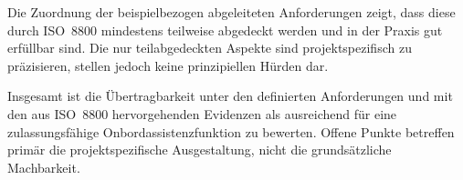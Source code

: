 Die Zuordnung der beispielbezogen abgeleiteten Anforderungen zeigt, dass diese durch ISO~8800 mindestens
teilweise abgedeckt werden und in der Praxis gut erfüllbar sind. Die nur teilabgedeckten Aspekte sind
projektspezifisch zu präzisieren, stellen jedoch keine prinzipiellen Hürden dar.

Insgesamt ist die Übertragbarkeit unter den definierten Anforderungen und mit den aus ISO~8800
hervorgehenden Evidenzen als ausreichend für eine zulassungsfähige Onbordassistenzfunktion zu bewerten.
Offene Punkte betreffen primär die projektspezifische Ausgestaltung, nicht die
grundsätzliche Machbarkeit.
